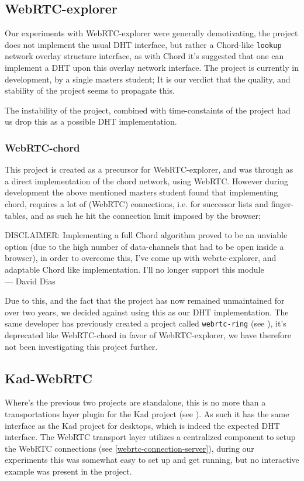 \subsection{WebRTC-explorer}
Our experiments with WebRTC-explorer were generally demotivating, the project
does not implement the usual DHT interface, but rather a Chord-like
\verb|lookup| network overlay structure interface, as with Chord it's suggested
that one can implement a DHT upon this overlay network interface.
\newline
The project is currently in development, by a single masters student; It is our
verdict that the quality, and stability of the project seems to propagate this.

The instability of the project, combined with time-constaints of the project
had us drop this as a possible DHT implementation.

\subsubsection{WebRTC-chord}
This project is created as a precursor for WebRTC-explorer, and was through as
a direct implementation of the chord network, using WebRTC. However during 
development the above mentioned masters student found that implementing chord,
requires a lot of (WebRTC) connections, i.e. for successor lists and
finger-tables, and as such he hit the connection limit imposed by the browser;

\begin{displayquote}
    DISCLAIMER: Implementing a full Chord algorithm proved to be an unviable option
    (due to the high number of data-channels that had to be open inside a browser),
    in order to overcome this, I've come up with webrtc-explorer, and adaptable
    Chord like implementation. I'll no longer support this module \\ \medskip
    --- David Dias
\end{displayquote}
Due to this, and the fact that the project has now remained unmaintained for
over two years, we decided against using this as our DHT implementation.
\newline\newline
The same developer has previously created a project called \verb|webrtc-ring|
(see \citep{diasdavid:webrtc-ring}), it's deprecated like WebRTC-chord in favor
of WebRTC-explorer, we have therefore not been investigating this project
further.

\subsection{Kad-WebRTC}
Where's the previous two projects are standalone, this is no more than a 
transportations layer plugin for the Kad project (see \citep{kadtools:kad}).
As such it has the same interface as the Kad project for desktops, which is
indeed the  expected DHT interface. The WebRTC transport layer utilizes a
centralized component to setup the WebRTC connections (see
\ref{webrtc-connection-server}), during our experiments this was somewhat easy
to set up and get running, but no interactive example was present in the
project.

